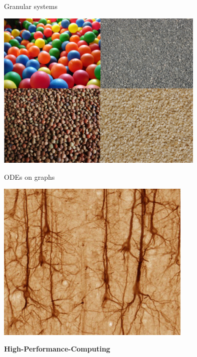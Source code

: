 \begin{frame}
\begin{minipage}{0.48\textwidth}\begin{center}
  Granular systems

  \includegraphics[draft=false,width=0.75\textwidth]{granular_system.png}
 \end{center} \end{minipage}
\pause
\begin{minipage}{0.48\textwidth}\begin{center}
  ODEs on graphs

  \includegraphics[draft=false,width=0.7\textwidth]{neuron.jpg}
 \end{center}\end{minipage}

 \vspace{2ex}
 \centerline{\bf High-Performance-Computing}

\end{frame}



